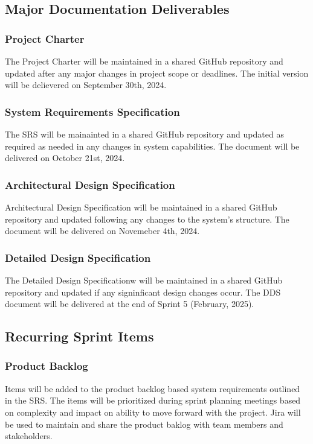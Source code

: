 
\subsection{Major Documentation Deliverables}

\subsubsection{Project Charter}
The Project Charter will be maintained in a shared GitHub repository and updated after any major changes in project scope or deadlines. The initial version will be delievered on September 30th, 2024.

\subsubsection{System Requirements Specification}
The SRS will be mainainted in a shared GitHub repository and updated as required as needed in any changes in system capabilities. The document will be delivered on October 21st, 2024.

\subsubsection{Architectural Design Specification}
Architectural Design Specification will be maintained in a shared GitHub repository and updated following any changes to the system's structure. The document will be delivered on Novemeber 4th, 2024. 


\subsubsection{Detailed Design Specification}
The Detailed Design Specificationw will be maintained in a shared GitHub repository and updated if any signinficant design changes occur. The DDS document will be delivered at the end of Sprint 5 (February, 2025).

\subsection{Recurring Sprint Items}

\subsubsection{Product Backlog}
Items will be added to the product backlog based system requirements outlined in the SRS. The items will be prioritized during sprint planning meetings based on complexity and impact on ability to move forward with the project. Jira will be used to maintain and share the product baklog with team members and stakeholders.

